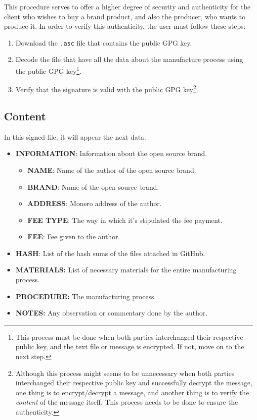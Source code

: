 \documentclass[12pt,a4paper]{article}
\begin{document}
This procedure serves to offer a higher degree of security and authenticity for the client who wishes to buy a brand product, and also the producer, who wants to produce it. In order to verify this authenticity, the user must follow these steps:

\begin{enumerate}
\item Download the \texttt{.asc} file that contains the public GPG key.
\item Decode the file that have all the data about the manufacture process using the public GPG key\footnote{This process must be done when both parties interchanged their respective public key, and the text file or message is encrypted. If not, move on to the next step.}.
\item Verify that the signature is valid with the public GPG key\footnote{Although this process might seems to be unnecessary when both parties interchanged their respective public key and successfully decrypt the message, one thing is to encrypt/decrypt a message, and another thing is to verify the \textit{content} of the message itself. This process needs to be done to ensure the authenticity.}.
\end{enumerate}

\subsection{Content}
In this signed file, it will appear the next data:

\begin{itemize}
\item \textbf{INFORMATION}: Information about the open source brand.
	\begin{itemize}
	\item \textbf{NAME}: Name of the author of the open source brand.
	\item \textbf{BRAND}: Name of the open source brand.
	\item \textbf{ADDRESS}: Monero address of the author.
	\item \textbf{FEE TYPE}: The way in which it's stipulated the fee payment.
	\item \textbf{FEE}: Fee given to the author.
	\end{itemize}
\item \textbf{HASH}: List of the hash sums of the files attached in GitHub.
\item \textbf{MATERIALS:} List of necessary materials for the entire manufacturing process.
\item \textbf{PROCEDURE:} The manufacturing process.
\item \textbf{NOTES:} Any observation or commentary done by the author.
\end{itemize}
\end{document}
